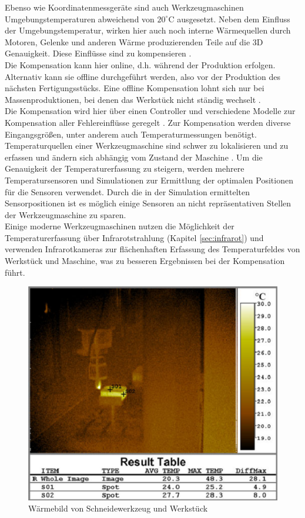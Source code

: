 Ebenso wie Koordinatenmessgeräte sind auch Werkzeugmaschinen Umgebungstemperaturen abweichend von $20^\circ\text{C}$ ausgesetzt. Neben dem Einfluss der Umgebungstemperatur, wirken hier auch noch interne Wärmequellen durch Motoren, Gelenke und anderen Wärme produzierenden Teile auf die 3D Genauigkeit. Diese Einflüsse sind zu kompensieren \cite{yuan1998}.\\
Die Kompensation kann hier online, d.h. während der Produktion erfolgen. Alternativ kann sie offline durchgeführt werden, also vor der Produktion des nächsten Fertigungsstücks. Eine offline Kompensation lohnt sich nur bei Massenproduktionen, bei denen das Werkstück nicht ständig wechselt \cite{yuan1998}. \\
Die Kompensation wird hier über einen Controller und verschiedene Modelle zur Kompensation aller Fehlereinflüsse geregelt \cite{mekid2010}. Zur Kompensation werden diverse Eingangsgrößen, unter anderem auch Temperaturmessungen benötigt. Temperaturquellen einer Werkzeugmaschine sind schwer zu lokalisieren und zu erfassen und ändern sich abhängig vom Zustand der Maschine \cite{mekid2010}. Um die Genauigkeit der Temperaturerfassung zu steigern, werden mehrere Temperatursensoren und Simulationen zur Ermittlung der optimalen Positionen für die Sensoren verwendet. Durch die in der Simulation ermittelten Sensorpositionen ist es möglich einige Sensoren an nicht repräsentativen Stellen der Werkzeugmaschine zu sparen.\\
Einige moderne Werkzeugmaschinen nutzen die Möglichkeit der Temperaturerfassung über Infrarotstrahlung (Kapitel \ref{sec:infrarot}) und verwenden Infrarotkameras zur flächenhaften Erfassung des Temperaturfeldes von Werkstück und Maschine, was zu besseren Ergebnissen bei der Kompensation führt.
\begin{figure}[h]
	\label{fig:WMInfrarot}
	\centering
		\includegraphics[scale=2.0]{bilder/WMInfrarot}
	\caption[Wärmebild von Schneidewerkzeug und Werkstück]{Wärmebild von Schneidewerkzeug und Werkstück\protect\footnotemark}
\end{figure}
